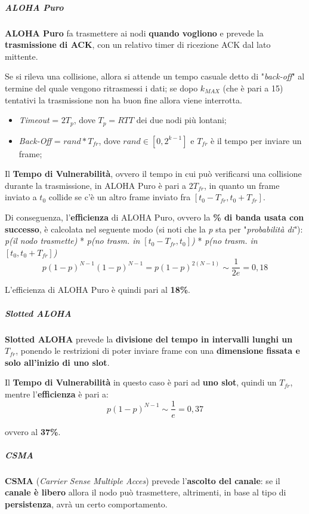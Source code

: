 \documentclass[a4paper]{article}
\begin{document}
					\subparagraph{ALOHA Puro}
						\textbf{ALOHA Puro} fa trasmettere ai nodi \textbf{quando vogliono} e prevede la \textbf{trasmissione di ACK}, con un relativo timer di ricezione ACK dal lato mittente.
						
						Se si rileva una collisione, allora si attende un tempo casuale detto di "\emph{back-off}" al termine del quale vengono ritrasmessi i dati; se dopo $ k_{MAX} $ (che è pari a 15) tentativi la trasmissione non ha buon fine allora viene interrotta.
						
						\begin{itemize}
							\item \emph{Timeout} = $ 2T_{p} $, dove $ T_{p} = RTT $ dei due nodi più lontani;
							\item \emph{Back-Off} = $ rand*T_{fr} $, dove $ rand \in [0, 2^{k-1}] $ e $ T_{fr} $ è il tempo per inviare un frame;
						\end{itemize}
						
						Il \textbf{Tempo di Vulnerabilità}, ovvero il tempo in cui può verificarsi una collisione durante la trasmissione, in ALOHA Puro è pari a $ 2T_{fr} $, in quanto un frame inviato a $ t_{0} $ collide se c'è un altro frame inviato fra $ [t_{0}-T_{fr}, t_{0}+T_{fr}] $.
						
						Di conseguenza, l'\textbf{efficienza} di ALOHA Puro, ovvero la \textbf{\% di banda usata con successo}, è calcolata nel seguente modo (si noti che la \emph{p} sta per "\emph{probabilità di}"):\\
						\emph{p(il nodo trasmette)} * \emph{p(no trasm. in $ [t_{0}-T_{fr}, t_{0}] $)} * \emph{p(no trasm. in $ [t_{0}, t_{0}+T_{fr}] $)} 
						\[ p(1-p)^{N-1}(1-p)^{N-1} = p(1-p)^{2(N-1)} \sim \frac{1}{2e} = 0,18 \]
						
						L'efficienza di ALOHA Puro è quindi pari al \textbf{18\%}.
						
					\subparagraph{Slotted ALOHA}
						\textbf{Slotted ALOHA} prevede la \textbf{divisione del tempo in intervalli lunghi un} $ T_{fr} $, ponendo le restrizioni di poter inviare frame con una \textbf{dimensione fissata e solo all'inizio di uno slot}.
						
						Il \textbf{Tempo di Vulnerabilità} in questo caso è pari ad \textbf{uno slot}, quindi un $ T_{fr} $, mentre l'\textbf{efficienza} è pari a:
						\[ p(1-p)^{N-1} \sim \frac{1}{e} = 0,37 \]						
						
						ovvero al \textbf{37\%}.
						
					\subparagraph{CSMA}
						\textbf{CSMA} (\emph{Carrier Sense Multiple Acces}) prevede l'\textbf{ascolto del canale}: se il \textbf{canale è libero} allora il nodo può trasmettere, altrimenti, in base al tipo di \textbf{persistenza}, avrà un certo comportamento.
						
\end{document}
